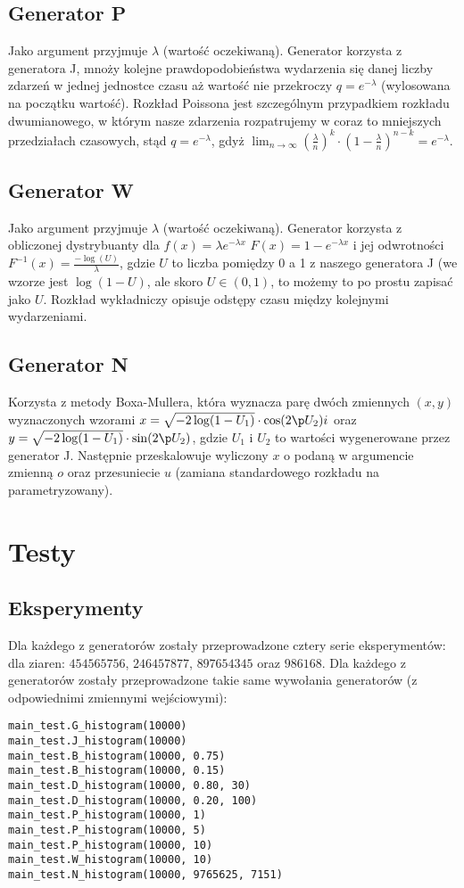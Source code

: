 \documentclass[60pt]{article}
\begin{document}
\subsection{Generator P}
Jako argument przyjmuje $\lambda$ (wartość oczekiwaną). Generator korzysta z generatora J, mnoży kolejne prawdopodobieństwa wydarzenia się danej liczby zdarzeń w jednej jednostce czasu aż wartość nie przekroczy $q = e^{-\lambda}$ (wylosowana na początku wartość). Rozkład Poissona jest szczególnym przypadkiem rozkładu dwumianowego, w którym nasze zdarzenia rozpatrujemy w coraz to mniejszych przedziałach czasowych, stąd $q = e^{-\lambda}$, gdyż $\lim_{n \to \infty} (\frac{\lambda}{n})^k \cdot(1 - \frac{\lambda}{n})^{n-k} = e^{-\lambda}$.

\subsection{Generator W}
Jako argument przyjmuje $\lambda$ (wartość oczekiwaną). Generator korzysta z obliczonej dystrybuanty dla $f(x) = \lambda e ^ {-\lambda x}$  $F(x) = 1 - e^{-\lambda x}$ i jej odwrotności $F^{-1}(x) = \frac{-\log(U)}{\lambda}$, gdzie $U$ to liczba pomiędzy 0 a 1 z naszego generatora J (we wzorze jest $\log(1 - U)$, ale skoro $U \in (0,1)$, to możemy to po prostu zapisać jako $U$. Rozkład wykładniczy opisuje odstępy czasu między kolejnymi wydarzeniami.

\subsection{Generator N}
Korzysta z metody Boxa-Mullera, która wyznacza parę dwóch zmiennych $(x,y)$ wyznaczonych wzorami $x = \sqrt{-2 \log (1 - U_1)} \cdot \cos(2 \p U_2)i$ oraz $y = \sqrt{-2 \log (1 - U_1)} \cdot \sin(2 \p U_2)$, gdzie $U_1$ i $U_2$ to wartości wygenerowane przez generator J. Następnie przeskalowuje wyliczony $x$ o podaną w argumencie zmienną $o$ oraz przesuniecie $u$ (zamiana standardowego rozkładu na parametryzowany).


\section{Testy}
\subsection{Eksperymenty}
Dla każdego z generatorów zostały przeprowadzone cztery serie eksperymentów: dla ziaren: $454565756$, $246457877$, $897654345$ oraz $986168$. Dla każdego z generatorów zostały przeprowadzone takie same wywołania generatorów (z odpowiednimi zmiennymi wejściowymi):
\begin{verbatim}
main_test.G_histogram(10000)
main_test.J_histogram(10000)
main_test.B_histogram(10000, 0.75)
main_test.B_histogram(10000, 0.15)
main_test.D_histogram(10000, 0.80, 30)
main_test.D_histogram(10000, 0.20, 100)
main_test.P_histogram(10000, 1)
main_test.P_histogram(10000, 5)
main_test.P_histogram(10000, 10)
main_test.W_histogram(10000, 10)
main_test.N_histogram(10000, 9765625, 7151)
\end{verbatim}
\end{document}
